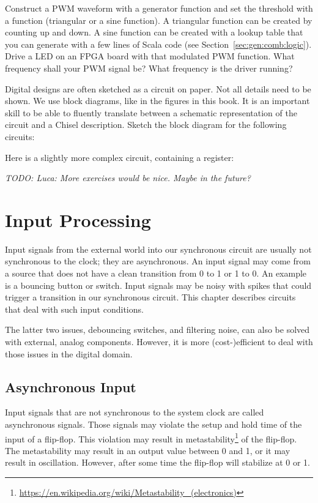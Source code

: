 \documentclass[%
    10pt,
    headinclude, footexclude,
    openright, %
    notitlepage,
    cleardoubleempty,
    headsepline,
    pointlessnumbers,
    bibtotoc, idxtotoc,
    ]{scrbook}
\newcommand{\todo}[1]{{\emph{TODO: #1}}}
\newcommand{\myref}[2]{\href{#1}{#2}}
\renewcommand{\myref}[2]{{#2}{\footnote{\url{#1}}}}
\begin{document}
Construct a PWM waveform with a generator function and set the threshold with a
function (triangular or a sine function).
A triangular function can be created by counting up and down. A sine function can be created with
a lookup table that you can generate with a few lines of Scala code
(see Section~\ref{sec:gen:comb:logic}).
Drive a LED on an FPGA board with that modulated PWM function. What frequency shall your
PWM signal be? What frequency is the driver running?

Digital designs are often sketched as a circuit on paper. Not all details need to be shown.
We use block diagrams, like in the figures in this book. It is an important skill to be able
to fluently translate between a schematic representation of the circuit and a Chisel description.
Sketch the block diagram for the following circuits:


\noindent Here is a slightly more complex circuit, containing a register:


\todo{Luca: More exercises would be nice. Maybe in the future?}


\chapter{Input Processing}
\label{sec:input}

Input signals from the external world into our synchronous circuit are usually
not synchronous to the clock; they are asynchronous.
An input signal may come from a source that does not have a clean transition from
0 to 1 or 1 to 0. An example is a bouncing button or switch.
Input signals may be noisy with spikes that could trigger a transition in our
synchronous circuit. This chapter describes circuits that deal with such input
conditions.

The latter two issues, debouncing switches, and filtering noise, can also be
solved with external, analog components. However, it is more (cost-)efficient
to deal with those issues in the digital domain.

\section{Asynchronous Input}

Input signals that are not synchronous to the system clock are called
asynchronous signals. Those signals may violate the setup and hold time
of the input of a flip-flop. This violation may result in
\myref{https://en.wikipedia.org/wiki/Metastability_(electronics)}{metastability}
of the flip-flop. The metastability may result in an output value between 0 and
1, or it may result in oscillation. However, after some time the flip-flop will
stabilize at 0 or 1.
\end{document}
